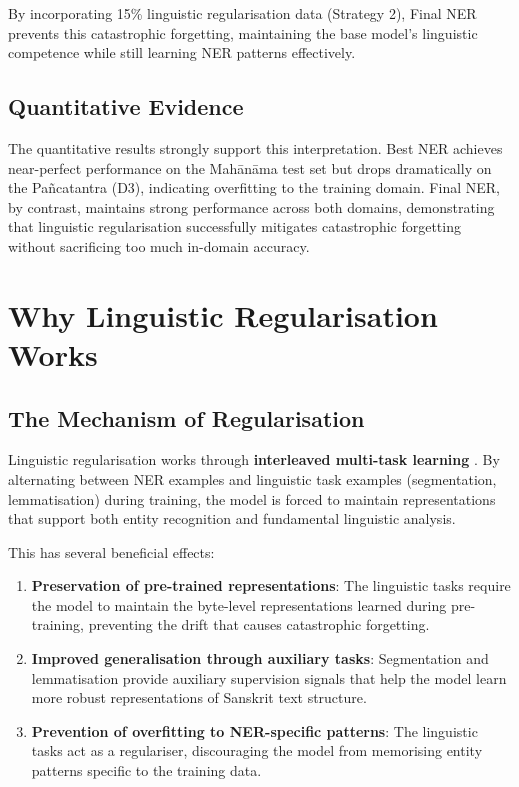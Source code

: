 By incorporating 15\% linguistic regularisation data (Strategy 2), Final NER prevents this catastrophic forgetting, maintaining the base model's linguistic competence while still learning NER patterns effectively.

\subsection{Quantitative Evidence}

The quantitative results strongly support this interpretation. Best NER achieves near-perfect performance on the Mah\={a}n\={a}ma \cite{sarkar2025mahanama} test set but drops dramatically on the Pa\~{n}catantra \cite{zeman2023ud} (D3), indicating overfitting to the training domain. Final NER, by contrast, maintains strong performance across both domains, demonstrating that linguistic regularisation successfully mitigates catastrophic forgetting \cite{mccloskey1989catastrophic} without sacrificing too much in-domain accuracy.

\section{Why Linguistic Regularisation Works}

\subsection{The Mechanism of Regularisation}

Linguistic regularisation works through \textbf{interleaved multi-task learning} \cite{caruana1997multitask}. By alternating between NER examples and linguistic task examples (segmentation, lemmatisation) during training, the model is forced to maintain representations that support both entity recognition and fundamental linguistic analysis.

This has several beneficial effects:

\begin{enumerate}
    \item \textbf{Preservation of pre-trained representations}: The linguistic tasks require the model to maintain the byte-level representations learned during pre-training, preventing the drift that causes catastrophic forgetting.
    \item \textbf{Improved generalisation through auxiliary tasks}: Segmentation and lemmatisation provide auxiliary supervision signals that help the model learn more robust representations of Sanskrit text structure.
    \item \textbf{Prevention of overfitting to NER-specific patterns}: The linguistic tasks act as a regulariser, discouraging the model from memorising entity patterns specific to the training data.
\end{enumerate}

